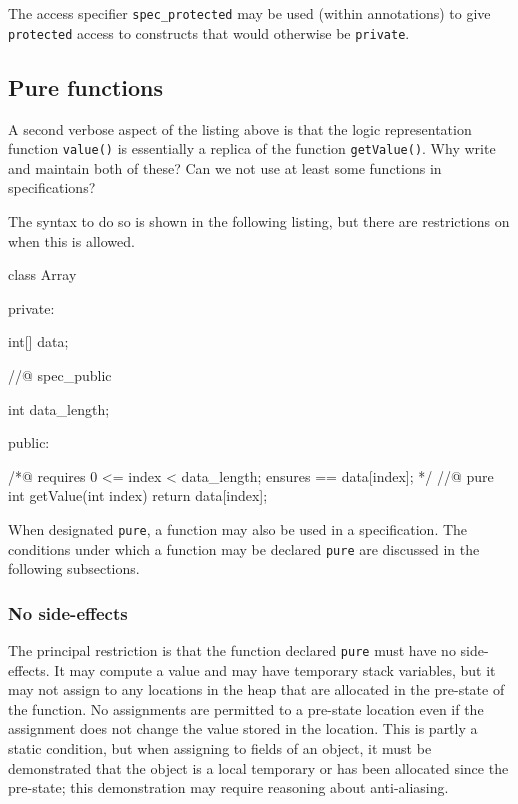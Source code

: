 The access specifier \lstinline|spec_protected| may be used (within \NAME{} annotations) to give \lang{} \lstinline|protected| access to \lang{} constructs
that would otherwise be \lstinline|private|.

\subsection{Pure functions}
\label{sec:pure}
A second verbose aspect of the listing above is that the logic representation function \lstinline|value()| is essentially a replica of
the \lang{} function \lstinline|getValue()|. Why write and maintain both of these? Can we not use at least some \lang{} functions in 
specifications?

The syntax to do so is shown in the following listing, but there are restrictions on when this is allowed.

\begin{listing-nonumber}
class Array {
	
  private:
	
    int[] data;
	
  //@ spec_public
	
    int data_length;
	
  public:
	
    /*@ 
      requires 0 <= index < data_length;
      ensures \result == data[index];
    */
    //@ pure
    int getValue(int index) {
		return data[index];
    }	
}
\end{listing-nonumber}

When designated \lstinline|pure|, a \lang{} function may also be used in a \NAME{} specification. The conditions under which a 
\lang{} function may be declared \lstinline|pure| are discussed in the following subsections.

\subsubsection{No side-effects}
The principal restriction is that the function declared \lstinline|pure| must have no side-effects. It may compute a value and may have 
temporary stack variables, but it may not assign to any locations in the heap that are allocated in the pre-state of the function.
No assignments are permitted to a pre-state location even if the assignment does not change the value stored in the location.
This is partly a static condition, but when assigning to fields of an object, it must be demonstrated that the object is a local temporary or
has been allocated since the pre-state; this demonstration may require reasoning about anti-aliasing.

